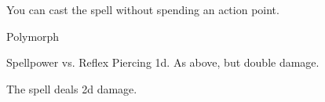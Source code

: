 You can cast the spell without spending an action point.
\begin{spellsection}{Polymorph}
\begin{spellheader}
\end{spellheader}
\begin{spellcontent}
\begin{spelltargetinginfo}
\end{spelltargetinginfo}
\begin{spelleffects}
\begin{spellattack}{Spellpower vs. Reflex}
\spellsuccess Piercing  \plus1d.
\spellcritical As above, but double damage.
\end{spellattack}
\end{spelleffects}
\end{spellcontent}
\begin{spellfooter}
\end{spellfooter}
\begin{spellsubcontent}
\begin{spellcantrip}
The spell deals \minus2d damage.
\end{spellcantrip}
\end{spellsubcontent}
\end{spellsection}
